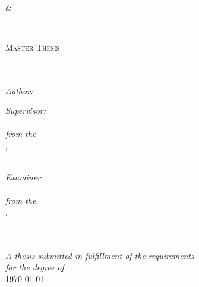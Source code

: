 
\begin{titlepage}
	\begin{center}

		{\scshape\LARGE \univone\\
			\&\par
			\univtwo\\
			\par}\vspace{1.5cm} %

		\textsc{\Large Master Thesis}\\[0.5cm] %

		\HRule \\[0.4cm] %
		{\huge \bfseries \ttitle\par}\vspace{0.4cm} %

		\HRule \\[1.5cm] %

		\large
		\emph{Author:}\\
		{\authorname} %
		\vspace{1cm}

		\large
		\emph{Supervisor:} \\
		\supname \\
		\textit{from the }\\
		\grouptwoname, \depttwo\\[0.1cm]
		\emph{\univtwo}\\
		\vspace{1cm}

		\large
		\emph{Examiner:} \\
		\examname \\
		\textit{from the }\\
		\groupname, \deptname\\[0.1cm]
		\emph{\univone}\\
		\vspace{1cm}

		\HRule \\[0.4cm]

		\large \textit{A thesis submitted in fulfillment of the requirements\\ for the degree of \degreename}\\[0.3cm]

		\vfill
		{\large \today}\\[2cm] %
	\end{center}
\end{titlepage}